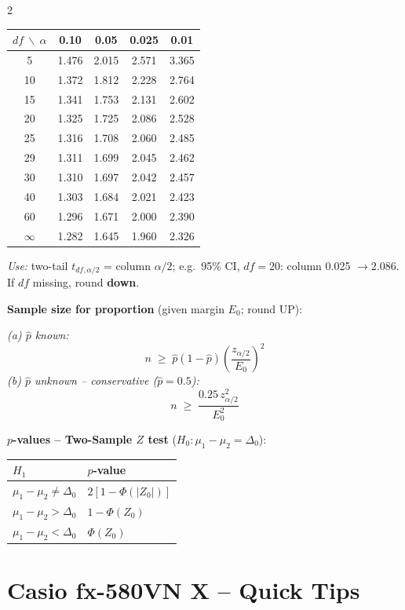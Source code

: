 \documentclass[9pt,a4paper]{extarticle}
\renewcommand{\arraystretch}{1.1}
\newcommand{\sh}[1]{\textbf{\color{BrickRed} #1}}
\begin{document}
\begin{multicols*}{2}
\begin{center}\scriptsize
\renewcommand{\arraystretch}{1.0}
\setlength{\tabcolsep}{2.5pt}
\begin{tabular}{@{}c|cccc@{}}
\toprule
$df\ \backslash\ \alpha$ & 0.10 & 0.05 & 0.025 & 0.01 \\
\midrule
5   & 1.476 & 2.015 & 2.571 & 3.365 \\
10  & 1.372 & 1.812 & 2.228 & 2.764 \\
15  & 1.341 & 1.753 & 2.131 & 2.602 \\
20  & 1.325 & 1.725 & 2.086 & 2.528 \\
25  & 1.316 & 1.708 & 2.060 & 2.485 \\
29  & 1.311 & 1.699 & 2.045 & 2.462 \\
30  & 1.310 & 1.697 & 2.042 & 2.457 \\
40  & 1.303 & 1.684 & 2.021 & 2.423 \\
60  & 1.296 & 1.671 & 2.000 & 2.390 \\
$\infty$ & 1.282 & 1.645 & 1.960 & 2.326 \\
\bottomrule
\end{tabular}
\end{center}
\textit{Use:} two-tail $t_{df,\alpha/2}$ = column $\alpha/2$; e.g.\ 95\% CI, $df\!=\!20$: column 0.025 $\to 2.086$. If $df$ missing, round \textbf{down}.

\sh{Sample size for proportion} (given margin $E_0$; round UP):

\textit{(a) $\hat{p}$ known:}
\[
n \;\ge\; \hat{p}(1-\hat{p})\!\left(\frac{z_{\alpha/2}}{E_0}\right)^{\!2}
\]
\textit{(b) $\hat{p}$ unknown -- conservative ($\hat{p}=0.5$):}
\[
n \;\ge\; \frac{0.25\,z_{\alpha/2}^{2}}{E_0^{2}}
\]

\sh{$p$-values -- Two-Sample $Z$ test} ($H_0\!:\mu_1\!-\!\mu_2\!=\!\Delta_0$):
\begin{center}\small
\renewcommand{\arraystretch}{1.1}
\begin{tabular}{@{}ll@{}}
\toprule
$H_1$ & $p$-value \\
\midrule
$\mu_1-\mu_2\ne\Delta_0$ & $2[1-\Phi(|Z_0|)]$ \\
$\mu_1-\mu_2>\Delta_0$   & $1-\Phi(Z_0)$ \\
$\mu_1-\mu_2<\Delta_0$   & $\Phi(Z_0)$ \\
\bottomrule
\end{tabular}
\end{center}

\section{Casio fx-580VN X -- Quick Tips}


\end{multicols*}
\end{document}
